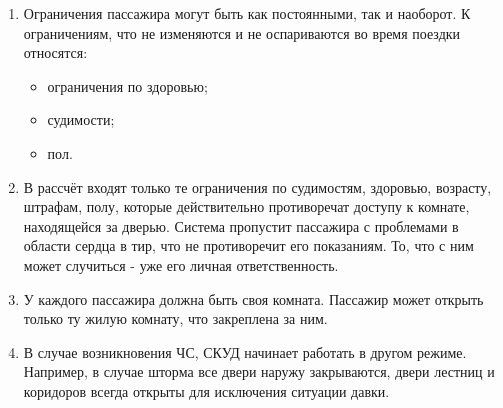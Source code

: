 \begin{enumerate}
	\item Ограничения пассажира могут быть как постоянными, так и наоборот. К ограничениям, что не изменяются и не оспариваются во время поездки относятся:
	\begin{itemize}
		\item ограничения по здоровью;
		\item судимости;
		\item пол.
	\end{itemize}
	\item В рассчёт входят только те ограничения по судимостям, здоровью, возрасту, штрафам, полу, которые действительно противоречат доступу к комнате, находящейся за дверью. Система пропустит пассажира с проблемами в области сердца в тир, что не противоречит его показаниям. То, что с ним может случиться - уже его личная ответственность.
	\item У каждого пассажира должна быть своя комната. Пассажир может открыть только ту жилую комнату, что закреплена за ним.
	\item В случае возникновения ЧС, СКУД начинает работать в другом режиме.
	Например, в случае шторма все двери наружу закрываются, двери лестниц и коридоров всегда открыты для исключения ситуации давки.
	
\end{enumerate}  